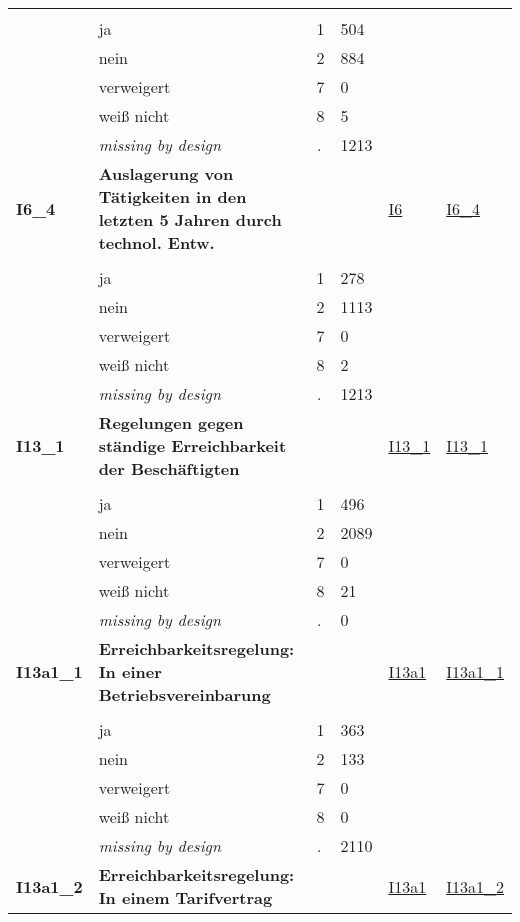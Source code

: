 \begin{longtable}{| L{2.45cm} | L{6cm} | C{1.5cm} | R{1cm} | C{2.25cm} | C{2.25cm} |}
   &  &  &  &  &  \\ 
   & ja & 1 & 504 &  &  \\ 
   & nein & 2 & 884 &  &  \\ 
   & verweigert & 7 & 0 &  &  \\ 
   & weiß nicht & 8 & 5 &  &  \\ 
   & \textit{missing by design} & \textit{.} & 1213 &  &  \\ 
   \midrule
\textbf{I6\_4}\label{var:I6:4} & \textbf{Auslagerung von Tätigkeiten in den letzten 5 Jahren durch technol. Entw.} &  &  & \hyperref[I6]{I6} & \hyperref[var:suf:I6:4]{I6\_4} \\ 
   &  &  &  &  &  \\ 
   & ja & 1 & 278 &  &  \\ 
   & nein & 2 & 1113 &  &  \\ 
   & verweigert & 7 & 0 &  &  \\ 
   & weiß nicht & 8 & 2 &  &  \\ 
   & \textit{missing by design} & \textit{.} & 1213 &  &  \\ 
   \midrule
\textbf{I13\_1}\label{var:I13:1} & \textbf{Regelungen gegen ständige Erreichbarkeit der Beschäftigten} &  &  & \hyperref[I13:1]{I13\_1} & \hyperref[var:suf:I13:1]{I13\_1} \\ 
   &  &  &  &  &  \\ 
   & ja & 1 & 496 &  &  \\ 
   & nein & 2 & 2089 &  &  \\ 
   & verweigert & 7 & 0 &  &  \\ 
   & weiß nicht & 8 & 21 &  &  \\ 
   & \textit{missing by design} & \textit{.} & 0 &  &  \\ 
   \midrule
\textbf{I13a1\_1}\label{var:I13a1:1} & \textbf{Erreichbarkeitsregelung: In einer Betriebsvereinbarung} &  &  & \hyperref[I13a1]{I13a1} & \hyperref[var:suf:I13a1:1]{I13a1\_1} \\ 
   &  &  &  &  &  \\ 
   & ja & 1 & 363 &  &  \\ 
   & nein & 2 & 133 &  &  \\ 
   & verweigert & 7 & 0 &  &  \\ 
   & weiß nicht & 8 & 0 &  &  \\ 
   & \textit{missing by design} & \textit{.} & 2110 &  &  \\ 
   \midrule
\textbf{I13a1\_2}\label{var:I13a1:2} & \textbf{Erreichbarkeitsregelung: In einem Tarifvertrag} &  &  & \hyperref[I13a1]{I13a1} & \hyperref[var:suf:I13a1:2]{I13a1\_2} \\ 

\end{longtable}
